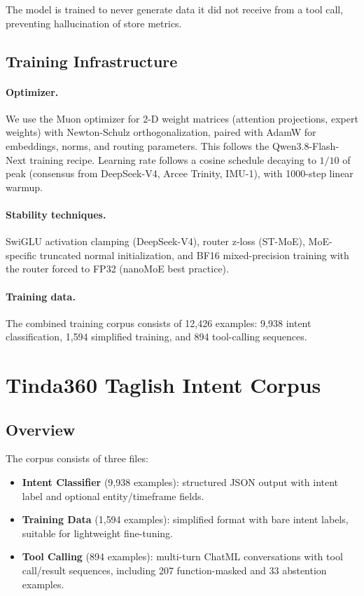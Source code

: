 \documentclass[11pt,a4paper]{article}
\begin{document}
The model is trained to never generate data it did not receive from a tool call,
preventing hallucination of store metrics.

\subsection{Training Infrastructure}

\paragraph{Optimizer.}
We use the Muon optimizer \citep{jordan2024muon} for 2-D weight matrices
(attention projections, expert weights) with Newton-Schulz orthogonalization,
paired with AdamW for embeddings, norms, and routing parameters. This follows
the Qwen3.8-Flash-Next training recipe. Learning rate follows a cosine schedule
decaying to $1/10$ of peak (consensus from DeepSeek-V4, Arcee Trinity, IMU-1),
with 1000-step linear warmup.

\paragraph{Stability techniques.}
SwiGLU activation clamping (DeepSeek-V4), router z-loss (ST-MoE),
MoE-specific truncated normal initialization, and BF16 mixed-precision
training with the router forced to FP32 (nanoMoE best practice).

\paragraph{Training data.}
The combined training corpus consists of 12{,}426 examples: 9{,}938 intent
classification, 1{,}594 simplified training, and 894 tool-calling sequences.

\section{Tinda360 Taglish Intent Corpus}
\label{sec:dataset}

\subsection{Overview}

The corpus consists of three files:

\begin{itemize}[leftmargin=*]
  \item \textbf{Intent Classifier} (9{,}938 examples): structured JSON output
    with intent label and optional entity/timeframe fields.
  \item \textbf{Training Data} (1{,}594 examples): simplified format with bare
    intent labels, suitable for lightweight fine-tuning.
  \item \textbf{Tool Calling} (894 examples): multi-turn ChatML conversations
    with tool call/result sequences, including 207 function-masked and 33
    abstention examples.
\end{itemize}
\end{document}
